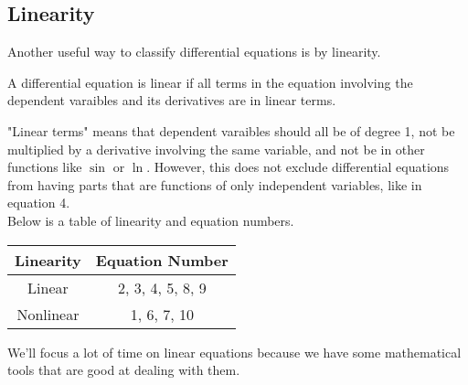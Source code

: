 \subsection{Linearity}
\noindent
Another useful way to classify differential equations is by linearity.
\begin{definition}
	A differential equation is linear if all terms in the equation involving the dependent varaibles and its derivatives are in linear terms.
\end{definition}
\noindent
"Linear terms" means that dependent varaibles should all be of degree 1, not be multiplied by a derivative involving the same variable, and not be in other functions like $\sin$ or $\ln$. However, this does not exclude differential equations from having parts that are functions of only independent variables, like in equation 4.\\

\noindent
Below is a table of linearity and equation numbers.
\begin{table}[H]
	\centering
	\begin{tabular}{c|c}
		Linearity & Equation Number \\
		\hline
		Linear &  2, 3, 4, 5, 8, 9 \\
		Nonlinear & 1, 6, 7, 10 \\
	\end{tabular}
\end{table}
\noindent
We'll focus a lot of time on linear equations because we have some mathematical tools that are good at dealing with them.